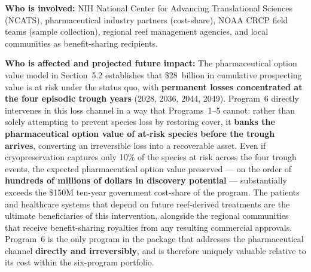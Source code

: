 \documentclass[10pt,letterpaper]{article}
\newcounter{gs}
\begin{document}
\begin{tcolorbox}[title=Program 6: Pharmaceutical Biodiversity Prospecting Fund --- \$15M Annual Total,
  colback=teal!5, colframe=teal!60!black, fonttitle=\bfseries, breakable]
  \medskip
  \textbf{Who is involved:} NIH National Center for Advancing Translational Sciences (NCATS),
  pharmaceutical industry partners (cost-share), NOAA CRCP field teams (sample collection),
  regional reef management agencies, and local communities as benefit-sharing recipients.

  \medskip
  \textbf{Who is affected and projected future impact:} The pharmaceutical option value model
  in Section~5.2 establishes that \$28~billion in cumulative prospecting value is at risk under
  the status quo, with \textbf{permanent losses concentrated at the four episodic trough years}
  (2028, 2036, 2044, 2049). Program~6 directly intervenes in this loss channel in a way that
  Programs~1--5 cannot: rather than solely attempting to prevent species loss by restoring
  cover, it \textbf{banks the pharmaceutical option value of at-risk species before the trough
  arrives}, converting an irreversible loss into a recoverable asset. Even if cryopreservation
  captures only 10\% of the species at risk across the four trough events, the expected
  pharmaceutical option value preserved --- on the order of \textbf{hundreds of millions of
  dollars in discovery potential} --- substantially exceeds the \$150M ten-year government
  cost-share of the program. The patients and healthcare systems that depend on future
  reef-derived treatments are the ultimate beneficiaries of this intervention, alongside the
  regional communities that receive benefit-sharing royalties from any resulting commercial
  approvals. Program~6 is the only program in the package that addresses the pharmaceutical
  channel \textbf{directly and irreversibly}, and is therefore uniquely valuable relative to
  its cost within the six-program portfolio.
\end{tcolorbox}

\medskip
\end{document}
